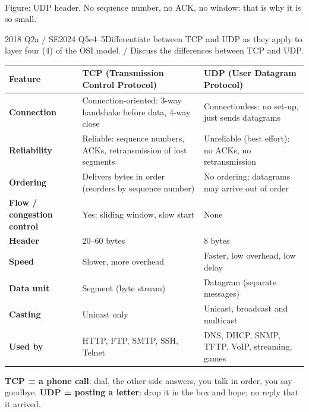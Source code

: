 \documentclass[10pt]{article}
\begin{document}
\begin{center}
\\
{\scriptsize\color{midgrey}Figure: UDP header. No sequence number, no ACK, no window: that is why it is so small.}
\end{center}

\begin{pastq}{2018 Q2a \textnormal{/} SE2024 Q5e}{4--5}Differentiate between TCP and UDP as they apply to layer four (4) of the OSI model. / Discuss the differences between TCP and UDP.\end{pastq}
\begin{ans}
\small
\begin{tabularx}{\linewidth}{@{}>{\bfseries}p{2.3cm}XX@{}}
\toprule
Feature & TCP (Transmission Control Protocol) & UDP (User Datagram Protocol)\\\midrule
Connection & Connection-oriented: 3-way handshake before data, 4-way close & Connectionless: no set-up, just sends datagrams\\
Reliability & Reliable: sequence numbers, ACKs, retransmission of lost segments & Unreliable (best effort): no ACKs, no retransmission\\
Ordering & Delivers bytes in order (reorders by sequence number) & No ordering; datagrams may arrive out of order\\
Flow / congestion control & Yes: sliding window, slow start & None\\
Header & 20--60 bytes & 8 bytes\\
Speed & Slower, more overhead & Faster, low overhead, low delay\\
Data unit & Segment (byte stream) & Datagram (separate messages)\\
Casting & Unicast only & Unicast, broadcast and multicast\\
Used by & HTTP, FTP, SMTP, SSH, Telnet & DNS, DHCP, SNMP, TFTP, VoIP, streaming, games\\
\bottomrule
\end{tabularx}
\end{ans}
\begin{mnemonic}
\textbf{TCP = a phone call}: dial, the other side answers, you talk in order, you say goodbye.
\textbf{UDP = posting a letter}: drop it in the box and hope; no reply that it arrived.
\end{mnemonic}
\end{document}
